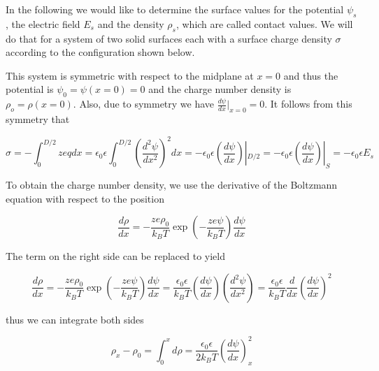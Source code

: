 \documentclass[letterpaper,10pt,english]{sphinxmanual}
\let\sphinxpxdimen\pdfpxdimen\else\newdimen\sphinxpxdimen
\begin{document}
\sphinxAtStartPar
In the following we would like to determine the surface values for the potential \(\psi_s\), the electric field \(E_s\) and the density \(\rho_s\), which are called contact values. We will do that for a system of two solid surfaces each with a surface charge density \(\sigma\) according to the configuration shown below.

\noindent\sphinxincludegraphics[width=555\sphinxpxdimen,height=309\sphinxpxdimen]{{configuration}.png}

\sphinxAtStartPar
This system is symmetric with respect to the mid\sphinxhyphen{}plane at \(x=0\) and thus the potential is \(\psi_0=\psi(x=0)=0\) and the charge number density is \(\rho_o=\rho(x=0)\). Also, due to symmetry we have \(\frac{d\psi}{dx}|_{x=0}=0\). It follows from this symmetry that

\sphinxAtStartPar
\begin{equation}
\sigma=-\int_{0}^{D / 2} z e q d x=\epsilon_{0} \epsilon \int_0^{D / 2}\left(\frac{d^{2} \psi}{d x^{2}}\right)^{2} dx=-\epsilon_{0} \epsilon\left(\frac{d \psi}{d x}\right)|_{D / 2}=-\epsilon_{0} \epsilon\left(\frac{d \psi}{d x}\right)|_{S}=-\epsilon_0 \epsilon E_{s}
\end{equation}

\sphinxAtStartPar
To obtain the charge number density, we use the derivative of the Boltzmann equation with respect to the position

\sphinxAtStartPar
\begin{equation}
\frac{d\rho}{dx}=-\frac{ze\rho_0}{k_B T}\exp\left ( -\frac{z e\psi}{k_B T}\right)\frac{d\psi}{dx}
\end{equation}

\sphinxAtStartPar
The term on the right side can be replaced to yield

\sphinxAtStartPar
\begin{equation}
\frac{d\rho}{dx}=-\frac{ze\rho_0}{k_B T}\exp\left ( -\frac{z e\psi}{k_B T}\right)\frac{d\psi}{dx}=\frac{\epsilon_0 \epsilon}{k_B T}\left ( \frac{d\psi}{dx}\right ) \left (\frac{d^2\psi}{dx^2} \right )=\frac{\epsilon_0 \epsilon}{k_B T}\frac{d}{dx}\left ( \frac{d\psi}{dx}\right )^2
\end{equation}

\sphinxAtStartPar
thus we can integrate both sides

\sphinxAtStartPar
\begin{equation}
\rho_x- \rho_0=\int_0^{x}d\rho = \frac{\epsilon_0 \epsilon}{2k_B T} \left (\frac{d\psi}{dx} \right )^2_x
\end{equation}
\end{document}
